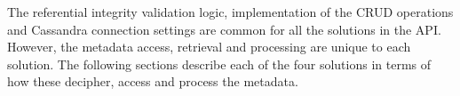 % 		
% 		
		The referential integrity validation logic, implementation of the \ac{CRUD}
		operations and Cassandra connection settings are common for all the solutions
		in the \ac{API}. However, the metadata access, retrieval and
		processing are unique to each solution. The following sections describe each
		of the four solutions in terms of how these decipher, access and process the metadata. 

